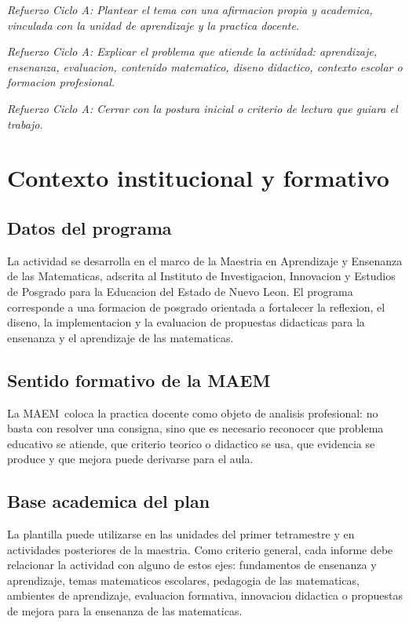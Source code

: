 \documentclass[
	spanish,
	letterpaper, oneside
]{article}
\def\universityname {Instituto de Investigacion, Innovacion y Estudios de Posgrado para la Educacion del Estado de Nuevo Leon}
\def\universityfaculty {Maestria en Aprendizaje y Ensenanza de las Matematicas}
\def\programshort {MAEM}
\begin{document}
\textit{Refuerzo Ciclo A: Plantear el tema con una afirmacion propia y academica, vinculada con la unidad de aprendizaje y la practica docente.}

\textit{Refuerzo Ciclo A: Explicar el problema que atiende la actividad: aprendizaje, ensenanza, evaluacion, contenido matematico, diseno didactico, contexto escolar o formacion profesional.}

\textit{Refuerzo Ciclo A: Cerrar con la postura inicial o criterio de lectura que guiara el trabajo.}

\section{Contexto institucional y formativo}

\subsection{Datos del programa}

La actividad se desarrolla en el marco de la \universityfaculty, adscrita al
\universityname. El programa corresponde a una formacion de posgrado orientada a
fortalecer la reflexion, el diseno, la implementacion y la evaluacion de
propuestas didacticas para la ensenanza y el aprendizaje de las matematicas.

\subsection{Sentido formativo de la MAEM}

La \programshort\ coloca la practica docente como objeto de analisis profesional:
no basta con resolver una consigna, sino que es necesario reconocer que problema
educativo se atiende, que criterio teorico o didactico se usa, que evidencia se
produce y que mejora puede derivarse para el aula.

\subsection{Base academica del plan}

La plantilla puede utilizarse en las unidades del primer tetramestre y en
actividades posteriores de la maestria. Como criterio general, cada informe debe
relacionar la actividad con alguno de estos ejes: fundamentos de ensenanza y
aprendizaje, temas matematicos escolares, pedagogia de las matematicas,
ambientes de aprendizaje, evaluacion formativa, innovacion didactica o
propuestas de mejora para la ensenanza de las matematicas.
\end{document}

